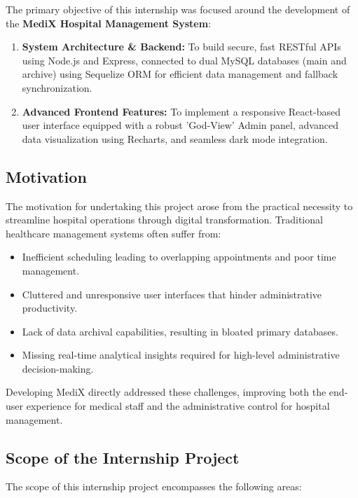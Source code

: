 \documentclass[12pt,a4paper]{article}
\begin{document}
The primary objective of this internship was focused around the development of the \textbf{MediX Hospital Management System}:

\begin{enumerate}
    \item \textbf{System Architecture \& Backend:} To build secure, fast RESTful APIs using Node.js and Express, connected to dual MySQL databases (main and archive) using Sequelize ORM for efficient data management and fallback synchronization.
    \item \textbf{Advanced Frontend Features:} To implement a responsive React-based user interface equipped with a robust 'God-View' Admin panel, advanced data visualization using Recharts, and seamless dark mode integration.
\end{enumerate}

\subsection{Motivation}

The motivation for undertaking this project arose from the practical necessity to streamline hospital operations through digital transformation. Traditional healthcare management systems often suffer from:

\begin{itemize}
    \item Inefficient scheduling leading to overlapping appointments and poor time management.
    \item Cluttered and unresponsive user interfaces that hinder administrative productivity.
    \item Lack of data archival capabilities, resulting in bloated primary databases.
    \item Missing real-time analytical insights required for high-level administrative decision-making.
\end{itemize}

Developing MediX directly addressed these challenges, improving both the end-user experience for medical staff and the administrative control for hospital management.

\subsection{Scope of the Internship Project}

The scope of this internship project encompasses the following areas:
\end{document}

